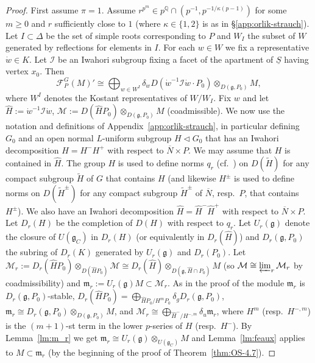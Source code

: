 \documentclass[a4paper]{amsart}
\numberwithin{equation}{section}
\theoremstyle{remark}
\theoremstyle{definition}
\newcommand{\Q}{\mathbb{Q}}
\newcommand{\alggrp}[1]{\underline{#1}}
\renewcommand{\o}[1]{\overline{#1}}
\begin{document}
\begin{proof}
  First assume $\pi = 1$.
  Assume $r^{p^m} \in p^{\Q} \cap (p^{-1},p^{-1/\kappa(p-1)})$ for some $m \ge 0$ and $r$ sufficiently close to $1$
  (where $\kappa \in \{1,2\}$ is as in \S\ref{app:orlik-strauch}).
  Let $I \subset \Delta$ be the set of simple roots corresponding to $P$ and $W_{I}$ the subset of $W$ generated by reflections for elements in $I$.
  For each $w\in W$ we fix a representative $\dot{w}\in K$.
  Let $\mathcal{I}$ be an Iwahori subgroup fixing a facet of the apartment of $\alggrp S$ having vertex $x_0$.
  Then
  \begin{equation*}
    \mathcal{F}_P^G(M)' \cong \bigoplus_{w \in W^I} \delta_{\dot w} D(\dot{w}^{-1} \mathcal{I} \dot{w} \cdot P_0) \otimes_{D(\mathfrak{g},P_0)} M,
  \end{equation*}
  where $W^I$ denotes the Kostant representatives of $W/W_I$.
  Fix $w$ and let $\hat H := \dot{w}^{-1} \mathcal{I} \dot{w}$, $\mathcal{M} := D(\hat HP_0) \otimes_{D(\mathfrak{g},P_0)} M$ (coadmissible).
  We now use the notation and definitions of Appendix~\ref{app:orlik-strauch}, in particular defining $G_0$ and an open normal $L$-uniform subgroup $H \lhd G_0$ that has an Iwahori decomposition $H = H^- H^+$ with respect to $\o N \times P$. 
  We may assume that $H$ is contained in $\hat H$.
  The group $H$ is used to define norms $q_r$ (cf.\ \cite[2.2.6]{OS}) on $D(\widetilde{H})$ for any compact subgroup $\widetilde{H}$ of $G$ that contains $H$
  (and likewise $H^{\pm}$ is used to define norms on $D(\widetilde{H}^\pm)$ for any compact subgroup $\widetilde{H}^\pm$ of $\o N$, resp.\ $P$, that contains $H^\pm$).
  We also have an Iwahori decomposition $\hat H = \hat H^- \hat H^+$ with respect to $\o N \times P$.
  Let $D_{r}(H)$ be the completion of $D(H)$ with respect to $q_{r}$.
  Let $U_{r}(\mathfrak{g})$ denote the closure of $U(\mathfrak{g}_{C})$ in $D_r(H)$ (or equivalently in $D_r(\hat H)$) and $D_r(\mathfrak{g},P_0)$ the subring of $D_r(K)$ generated by $U_{r}(\mathfrak{g})$ and $D_r(P_0)$.
  Let $\mathcal{M}_{r} := D_r(\hat HP_0) \otimes_{D(\hat HP_0)} \mathcal{M} \cong D_r(\hat H) \otimes_{D(\mathfrak{g},\hat H \cap P_0)} M$ (so $\mathcal M \cong \varprojlim_r \mathcal M_r$ by coadmissibility) and $\mathfrak{m}_{r} := U_{r}(\mathfrak{g}) M \subset \mathcal{M}_{r}$.
  As in the proof of \cite[Theorem 4.5]{OS3} the module $\mathfrak{m}_{r}$ is $D_r(\mathfrak{g},P_0)$-stable, $D_r(\hat HP_0) = \bigoplus_{\hat HP_0/H^mP_0} \delta_g D_r(\mathfrak{g},P_0)$,
  $\mathfrak{m}_{r} \cong D_r(\mathfrak{g},P_0) \otimes_{D(\mathfrak{g},P_0)} M$, and $\mathcal{M}_{r} \cong \bigoplus_{\hat H^-/H^{-,m}} \delta_u \mathfrak{m}_{r}$,
  where $H^m$ (resp.\ $H^{-,m}$) is the $(m+1)$-st term in the lower $p$-series of $H$ (resp.\ $H^{-}$).
  By Lemma~\ref{lm:m_r} we get $\mathfrak{m}_{r} \cong U_{r}(\mathfrak{g})\otimes_{U(\mathfrak{g}_{C})} M$ and Lemma~\ref{lm:feaux} applies to $M \subset \mathfrak{m}_{r}$
  (by the beginning of the proof of Theorem~\ref{thm:OS-4.7}).


\end{proof}
\end{document}
